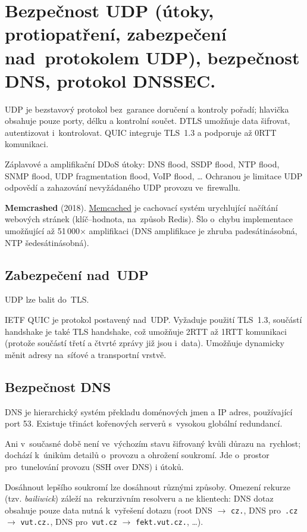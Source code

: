 \clearpage
\section{Bezpečnost UDP (útoky, protiopatření, zabezpečení nad~protokolem UDP), bezpečnost DNS, protokol DNSSEC.}

UDP je bezstavový protokol bez~garance doručení a kontroly pořadí; hlavička obsahuje pouze porty, délku a kontrolní součet.
DTLS umožňuje data šifrovat, autentizovat i~kontrolovat.
QUIC integruje TLS~1.3 a podporuje až 0RTT komunikaci.

Záplavové a amplifikační DDoS útoky:
DNS flood, SSDP flood, NTP flood, SNMP flood, UDP fragmentation flood, VoIP flood, \dots
Ochranou je limitace UDP odpovědí a zahazování nevyžádaného UDP provozu ve~firewallu.

\textbf{Memcrashed} (2018).
\href{https://memcached.org}{Memcached} je cachovací systém urychlující načítání webových stránek (klíč--hodnota, na~způsob Redis).
Šlo o~chybu implementace umožňující až 51\,000$\times$ amplifikaci (DNS amplifikace je zhruba padesátinásobná, NTP šedesátinásobná).


\subsection{Zabezpečení nad~UDP}

UDP lze balit do~TLS.

IETF QUIC je protokol postavený nad~UDP.
Vyžaduje použití TLS~1.3, součástí handshake je také TLS handshake, což umožňuje 2RTT až 1RTT komunikaci (protože součástí třetí a čtvrté zprávy již jsou i~data).
Umožňuje dynamicky měnit adresy na~síťové a transportní vrstvě.



\subsection{Bezpečnost DNS}

DNS je hierarchický systém překladu doménových jmen a IP adres, používající port 53.
Existuje třináct kořenových serverů s~vysokou globální redundancí.

Ani v~současné době není ve~výchozím stavu šifrovaný kvůli důrazu na~rychlost; dochází k~únikům detailů o~provozu a ohrožení soukromí.
Jde o~prostor pro~tunelování provozu (SSH over DNS) i útoků.

Dosáhnout lepšího soukromí lze dosáhnout různými způsoby.
Omezení rekurze (tzv. \emph{bailiwick}) záleží na~rekurzivním resolveru a ne klientech: DNS dotaz obsahuje pouze data nutná k~vyřešení dotazu (root DNS $\rightarrow$ \texttt{cz.}, DNS pro~\texttt{.cz} $\rightarrow$ \texttt{vut.cz.}, DNS pro~\texttt{vut.cz} $\rightarrow$ \texttt{fekt.vut.cz.}, \dots).

